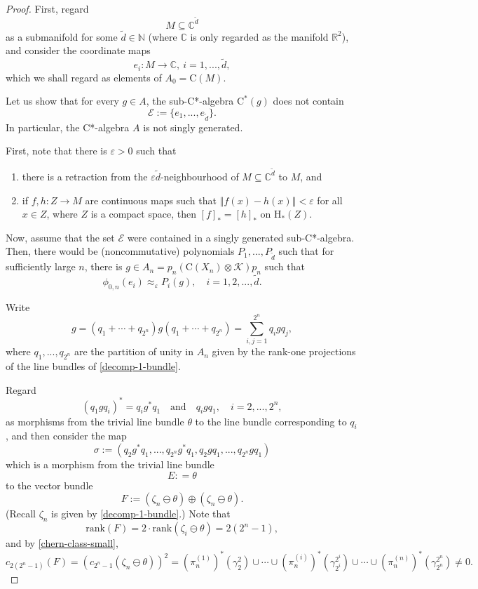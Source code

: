 \documentclass[12pt, oneside, psamsfonts]{amsart}
\theoremstyle{definition}
\theoremstyle{remark}
\numberwithin{equation}{section}
\newcommand{\norm}[1]{\left\Vert#1\right\Vert}
\newcommand{\Real}{\mathbb R}
\newcommand{\Comp}{\mathbb C}
\newcommand{\eps}{\varepsilon}
\begin{document}
\begin{proof}
First, regard $$M \subseteq \Comp^{\tilde{d}}$$ as a submanifold for some $\tilde{d} \in \mathbb N$ (where $\Comp$ is only regarded as the manifold $\Real^2$), and consider the coordinate maps $$e_i: M \to \Comp,\  i=1, ..., \tilde{d}, $$
which we shall regard as elements of $A_0 = \mathrm{C}(M)$.

Let us show that for every $g \in A$, the sub-C*-algebra $\mathrm{C^*}(g)$ does not contain $$\mathcal E  := \{e_1, ..., e_{\tilde{d}}\}. $$ In particular, the C*-algebra $A$ is not singly generated.

First, note that there is $\eps>0$ such that
\begin{enumerate}
\item there is a retraction from the $\eps \tilde{d}$-neighbourhood of $M \subseteq \Comp^{\tilde{d}}$ to $M$, and 
\item if $f, h: Z \to M$ are continuous maps such that $\norm{f(x) - h(x)} < \eps$ for all $x \in Z$, where $Z$ is a compact space, then $[f]_* = [h]_*$ on $\mathrm{H}_*(Z)$.
\end{enumerate}

Now, assume that the set $\mathcal E$ were contained in a singly generated sub-C*-algebra. Then, there would be (noncommutative) polynomials $P_1, ..., P_{\tilde{d}}$ such that for sufficiently large $n$, there is $g \in A_{n} = p_n (\mathrm{C}(X_{n}) \otimes \mathcal K) p_n $ such that
\begin{equation}\label{almost-gen}
 \phi_{0, n}(e_i) \approx_\eps P_i(g),\quad i=1, 2, ..., \tilde{d}.
\end{equation} 

Write
$$ g =(q_1 + \cdots + q_{2^n}) g (q_1 + \cdots + q_{2^{n}}) =  \sum_{i, j = 1}^{2^n} q_i g q_j,$$
where $q_1, ..., q_{2^n}$ are the partition of unity in $A_n$ given by the rank-one projections of the line bundles of \eqref{decomp-1-bundle}. %

Regard $$(q_1gq_i)^* = q_i g^*q_1\quad \mathrm{and} \quad q_i gq_1, \quad i=2, ..., 2^n, $$ as morphisms from the trivial line bundle $\theta$ to the line bundle corresponding to $q_i$, %
and then consider the map 
$$\sigma:=(q_2g^*q_1, ..., q_{2^n}g^*q_1, q_2gq_1, ..., q_{2^n}gq_1)$$
which is a morphism from the trivial line bundle $$E: = \theta$$ to the vector bundle 
$$F:= %
(\zeta_n \ominus\theta) \oplus (\zeta_n \ominus\theta). $$ 
(Recall $\zeta_n$ is given by \eqref{decomp-1-bundle}.)
Note that 
$$\mathrm{rank}(F) = 2\cdot \mathrm{rank}(\zeta_i\ominus\theta) = 2 (2^n-1), $$
and
by \eqref{chern-class-small},
\begin{equation}\label{chern-class-double}
c_{2(2^n - 1)}(F) = (c_{2^n - 1}(\zeta_n\ominus\theta))^2 = (\pi_{n}^{(1)})^*(\gamma_2^2) \cup \cdots \cup (\pi_{n}^{(i)})^*(\gamma^{2^{i}}_{2^{i}}) \cup \cdots \cup (\pi_{n}^{(n)})^*(\gamma^{2^{n}}_{2^n}) \neq 0. 
\end{equation}


\end{proof}
\end{document}
